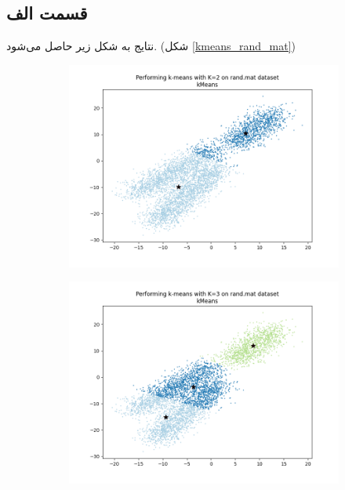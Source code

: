 \documentclass[12pt, a4paper]{article}
\begin{document}
\subsection*{قسمت الف}

نتایج به شکل زیر حاصل می‌شود. (شکل \ref{kmeans_rand_mat})

\begin{figure}[h]
    \centering
    \begin{subfigure}{.45\linewidth}
        \includegraphics[width=\linewidth]{images/q3/a/2.png}
    \end{subfigure}
    \hfill
    \begin{subfigure}{.45\linewidth}
        \includegraphics[width=\linewidth]{images/q3/a/3.png}

\end{subfigure}
\end{figure}
\end{document}
